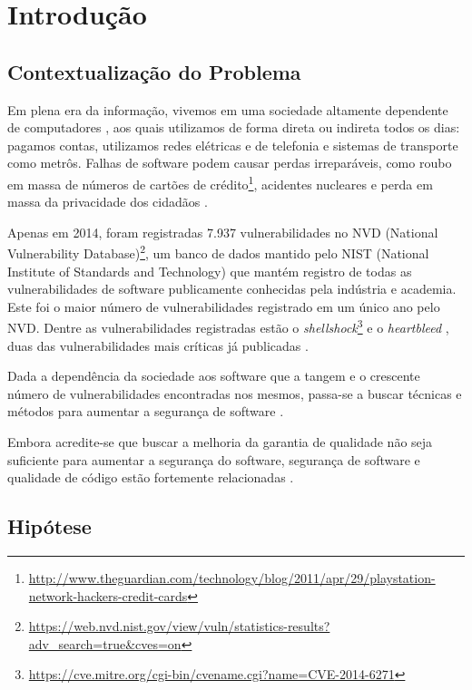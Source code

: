 \chapter{Introdução} \label{introducao}

\section{Contextualização do Problema}

Em plena era da informação, vivemos em uma sociedade altamente dependente de computadores \cite{inclusao}, aos quais utilizamos de forma direta ou indireta todos os dias: pagamos contas, utilizamos redes elétricas e de telefonia e sistemas de transporte como metrôs.  Falhas de software podem causar perdas irreparáveis, como roubo em massa de números de cartões de crédito\footnote{\url{http://www.theguardian.com/technology/blog/2011/apr/29/playstation-network-hackers-credit-cards}}, acidentes nucleares \cite{stuxnet} e perda em massa da privacidade dos cidadãos \cite{snowden}.

Apenas em 2014, foram registradas 7.937 vulnerabilidades no NVD (National Vulnerability Database)\footnote{\url{https://web.nvd.nist.gov/view/vuln/statistics-results?adv_search=true&cves=on}}, um banco de dados mantido pelo NIST (National Institute of Standards and Technology) que mantém registro de todas as vulnerabilidades de software publicamente conhecidas pela indústria e academia. Este foi o maior número de vulnerabilidades registrado em um único ano pelo NVD. Dentre as vulnerabilidades registradas estão o \textit{shellshock}\footnote{\url{https://cve.mitre.org/cgi-bin/cvename.cgi?name=CVE-2014-6271}} e o \textit{heartbleed} \cite{heartbleed}, duas das vulnerabilidades mais críticas já publicadas \cite{heartbleed}.

Dada a dependência da sociedade aos software que a tangem e o crescente número de vulnerabilidades encontradas nos mesmos, passa-se a buscar técnicas e métodos para aumentar a segurança de software \cite{sociedade}.

Embora acredite-se que buscar a melhoria da garantia de qualidade não seja suficiente para aumentar a segurança do software, segurança de software e qualidade de código estão fortemente relacionadas \cite{secure_programming}.

\section{Hipótese}

